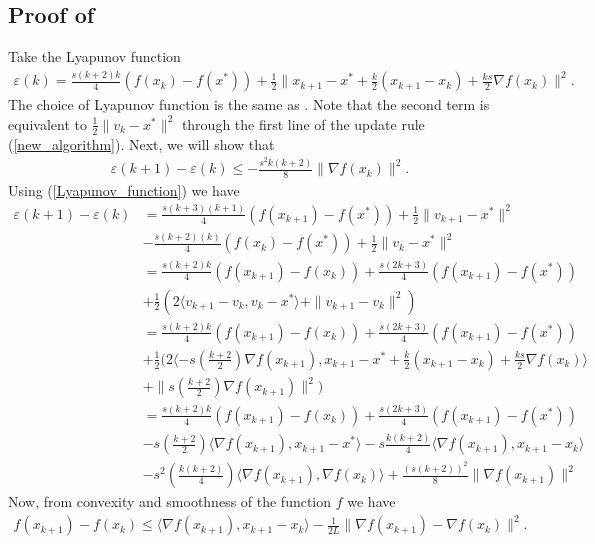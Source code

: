 \documentclass{article}
\theoremstyle{plain}
\theoremstyle{definition}
\theoremstyle{remark}
\begin{document}
\subsection{Proof of }\label{thm5_proof}
    Take the Lyapunov function 
\begin{align}\label{Lyapunov_function}
    \varepsilon(k) = \frac{s(k+2)k}{4}(f(x_k)-f(x^*))+\frac{1}{2}\|x_{k+1}-x^*+\frac{k}{2}(x_{k+1}-x_k)+\frac{ks}{2}\nabla f(x_k)\|^2.
\end{align}
The choice of Lyapunov function is the same as \citep{Shi2021UnderstandingTA}. Note that the second term is equivalent to $\frac{1}{2}\|v_k-x^*\|^2$ through the first line of the update rule (\ref{new_algorithm}). Next, we will show that 
\begin{align}\label{Lyap_1}
    \varepsilon(k+1)-\varepsilon(k)\leq -\frac{s^2k(k+2)}{8}\|\nabla f(x_k)\|^2.
\end{align}
Using (\ref{Lyapunov_function}) we have
\begin{align}\label{Lyap_2}
    \varepsilon(k+1)-\varepsilon(k)&=\frac{s(k+3)(k+1)}{4}(f(x_{k+1})-f(x^*))+\frac{1}{2}\|v_{k+1}-x^*\|^2\nonumber\\
    & - \frac{s(k+2)(k)}{4}(f(x_{k})-f(x^*))+\frac{1}{2}\|v_{k}-x^*\|^2\nonumber\\
    &=\frac{s(k+2)k}{4}(f(x_{k+1})-f(x_k))+\frac{s(2k+3)}{4}(f(x_{k+1})-f(x^*))\nonumber\\
    &+\frac{1}{2}(2\langle v_{k+1}-v_k,v_k-x^* \rangle+\|v_{k+1}-v_k\|^2)\nonumber\\
    &= \frac{s(k+2)k}{4}(f(x_{k+1})-f(x_k))+\frac{s(2k+3)}{4}(f(x_{k+1})-f(x^*))\nonumber\\
    &+\frac{1}{2}(2\langle -s(\frac{k+2}{2})\nabla f(x_{k+1}),x_{k+1}-x^*+\frac{k}{2}(x_{k+1}-x_k)+\frac{ks}{2}\nabla f(x_k) \rangle \nonumber\\
    &+\|s(\frac{k+2}{2})\nabla f(x_{k+1})\|^2)\nonumber\\
    &= \frac{s(k+2)k}{4}(f(x_{k+1})-f(x_k))+\frac{s(2k+3)}{4}(f(x_{k+1})-f(x^*))\nonumber\\
    &-s(\frac{k+2}{2})\langle \nabla f(x_{k+1}),x_{k+1}-x^*\rangle-s\frac{k(k+2)}{4}\langle \nabla f(x_{k+1}),x_{k+1}-x_k\rangle\nonumber\\
    & -s^2(\frac{k(k+2)}{4})\langle \nabla f(x_{k+1}),\nabla f(x_k)\rangle+ \frac{(s(k+2))^2}{8}\|\nabla f(x_{k+1})\|^2
\end{align}
Now, from convexity and smoothness of the function $f$ we have
\begin{align}\label{smooth_convex}
    f(x_{k+1})-f(x_k)\leq \langle \nabla f(x_{k+1}),x_{k+1}-x_k\rangle -\frac{1}{2L}\|\nabla f(x_{k+1})-\nabla f(x_k)\|^2.
\end{align}
\end{document}
